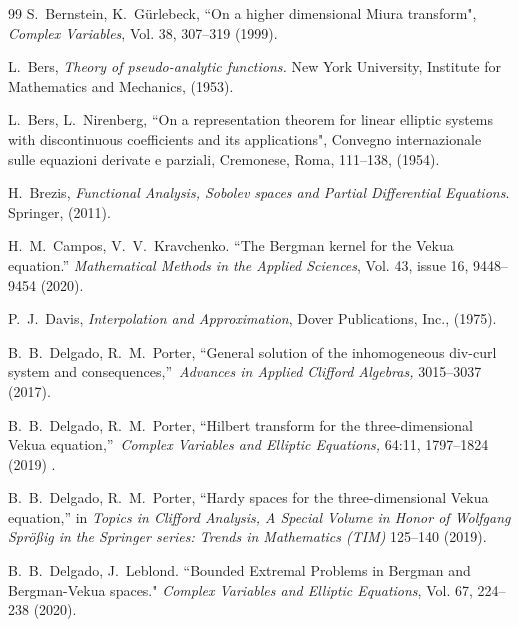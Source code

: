 \documentclass[12pt]{article}
\begin{document}
\begin{thebibliography}{99}
 S.~Bernstein, K.~G\"{u}rlebeck, ``On a higher dimensional Miura transform", {\em Complex Variables}, Vol. 38, 307--319 (1999).

 L.~Bers,  {\em Theory of pseudo-analytic functions.}
  New York University, Institute for Mathematics and Mechanics, (1953).

 L.~Bers, L.~Nirenberg, ``On a representation theorem for linear elliptic systems with discontinuous coefficients and its applications", Convegno internazionale sulle equazioni derivate e parziali, Cremonese, Roma, 111--138, (1954).

 H.~Brezis,  {\em Functional Analysis, Sobolev
    spaces and Partial Differential Equations}.  Springer, %
  (2011).
  
H.~M.~Campos, V.~V.~Kravchenko. ``The Bergman kernel for the Vekua equation.'' {\em Mathematical Methods in the Applied Sciences}, Vol. 43, issue 16, 9448--9454 (2020).


P.~J.~Davis, {\em Interpolation and Approximation}, Dover Publications, Inc., (1975).

B.~B.~Delgado, R.~M.~Porter, \textquotedblleft General solution of the inhomogeneous div-curl system and consequences,\textquotedblright\ \emph{Advances in Applied Clifford Algebras,} 3015--3037 (2017).

B.~B.~Delgado, R.~M.~Porter, \textquotedblleft Hilbert transform for the three-dimensional Vekua equation,\textquotedblright\ \emph{Complex Variables and Elliptic Equations,} 64:11, 1797--1824 (2019) .


B.~B.~Delgado, R.~M.~Porter, ``Hardy spaces for the three-dimensional Vekua equation,'' in {\em Topics in Clifford Analysis, A Special Volume in Honor of Wolfgang Spr\"{o}\ss{}ig in the Springer series: Trends in Mathematics (TIM)} 125--140 (2019).
  
B.~B.~Delgado, J.~Leblond. ``Bounded Extremal Problems in Bergman and Bergman-Vekua spaces." {\em Complex Variables and Elliptic Equations}, Vol. 67, 224--238 (2020).
		


\end{thebibliography}
\end{document}
